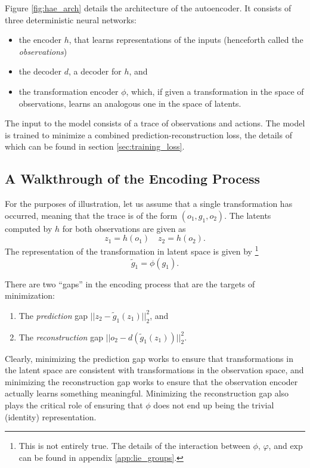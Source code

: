 \documentclass[10pt]{article} %
\begin{document}
Figure \ref{fig:hae_arch} details the architecture of the autoencoder. It consists of three deterministic neural networks:
\begin{itemize}
\item the encoder $h$, that learns representations of the inputs (henceforth called the \textit{observations})
\item the decoder $d$, a decoder for $h$, and
\item the transformation encoder $\phi$, which, if given a transformation in the space of observations, learns an analogous one in the space of latents.
\end{itemize}
The input to the model consists of a trace of observations and actions. The model is trained to minimize a combined prediction-reconstruction loss, the details of which can be found in section \ref{sec:training_loss}.

\subsection{A Walkthrough of the Encoding Process}
 For the purposes of illustration, let us assume that a single transformation has occurred, meaning that the trace is of the form $(o_1, g_1, o_2)$. The latents computed by $h$ for both observations are given as 
 \[ 
   z_1 = h(o_1) \quad z_2 = h(o_2)
 .\]
 The representation of the transformation in latent space is given by \footnote{This is not entirely true. The details of the interaction between $\phi$, $\varphi$, and $\text{exp}$ can be found in appendix \ref{app:lie_groups}.}
 \[ 
   \tilde{g}_1 = \phi(g_1)
 .\]
 
 There are two ``gaps'' in the encoding process that are the targets of minimization:
 \begin{enumerate}
 \item  The \textit{prediction} gap $||z_2 - \tilde{g}_1(z_1)||_2^2$, and
 \item The \textit{reconstruction} gap $||o_2 - d(\tilde{g}_1(z_1))||_2^2$.
 \end{enumerate}

 Clearly, minimizing the prediction gap works to ensure that transformations in the latent space are consistent with transformations in the observation space, and minimizing the reconstruction gap works to ensure that the observation encoder actually learns something meaningful. Minimizing the reconstruction gap also plays the critical role of ensuring that $\phi$ does not end up being the trivial (identity) representation.
\end{document}
